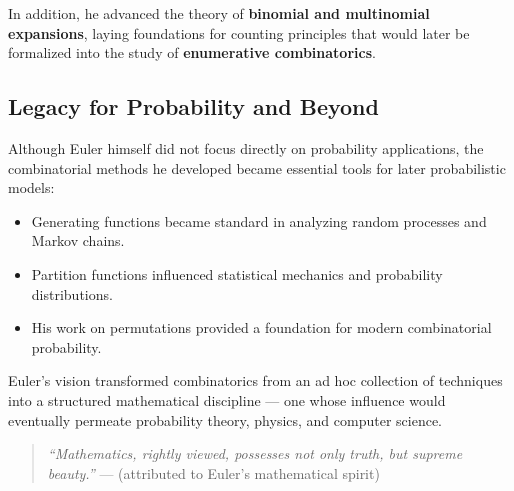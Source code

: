 In addition, he advanced the theory of \textbf{binomial and multinomial expansions}, laying foundations for counting principles that would later be formalized into the study of \textbf{enumerative combinatorics}.

\subsection{Legacy for Probability and Beyond}

Although Euler himself did not focus directly on probability applications, the combinatorial methods he developed became essential tools for later probabilistic models:

\begin{itemize}
    \item Generating functions became standard in analyzing random processes and Markov chains.
    \item Partition functions influenced statistical mechanics and probability distributions.
    \item His work on permutations provided a foundation for modern combinatorial probability.
\end{itemize}

Euler's vision transformed combinatorics from an ad hoc collection of techniques into a structured mathematical discipline — one whose influence would eventually permeate probability theory, physics, and computer science.

\begin{quote}
    \textit{``Mathematics, rightly viewed, possesses not only truth, but supreme beauty.''} — (attributed to Euler's mathematical spirit)
\end{quote}
